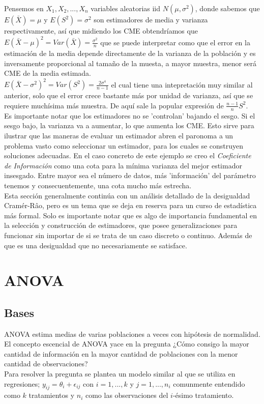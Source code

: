 \documentclass[11pt,a4paper,oneside]{report}
\theoremstyle{definition}
\theoremstyle{plain}
\theoremstyle{remark}
\begin{document}
Pensemos en $X_1,X_2,...,X_n$ variables aleatorias iid $N(\mu, \sigma^{2})$, donde sabemos que $E(\bar{X})=\mu$ y $E(S^{2})=\sigma^2$ son
estimadores de media y varianza respectivamente, así que midiendo los CME obtendríamos que\\
$E(\bar{X}-\mu)^{2}=Var(\bar{X})=\frac{\sigma^{2}}{n}$ que se puede interpretar como que el error en la estimación de la media depende 
directamente de la varianza de la población y es inversamente proporcional al tamaño de la muesta, a mayor muestra, menor será CME de la
media estimada.\\
$E(\bar{X}-\sigma^{2})^{2}=Var(S^2)=\frac{2\sigma^{4}}{n-1}$ el cual tiene una intepretación muy similar al anterior, solo que el error
crece bastante más por unidad de varianza, así que se requiere muchísima más muestra. De aquí sale la popular expresión de 
$\frac{n-1}{n} S^{2}$.\\
Es importante notar que los estimadores no se 'controlan' bajando el sesgo. Si el sesgo bajo, la varianza va a aumentar, lo que 
aumenta los CME. Esto sirve para ilustrar que las maneras de evaluar un estimador abren el paronoma a un problema vasto como seleccionar
un estimador, para los cuales se construyen soluciones adecuadas. En el caso concreto de este ejemplo se creo el \textit{Coeficiente de Información}
como una cota para la mínima varianza del mejor estimador insesgado. Entre mayor sea el número de datos, más 'información' del parámetro 
tenemos y consecuentemente, una cota mucho más estrecha.\\
Esta sección generalmente continúa con un análisis detallado de la desigualdad Cramér-Râo, pero es un tema que se deja en reserva para 
un curso de estadística más formal. Solo es importante notar que es algo de importancia fundamental en la selección y construcción de
estimadores, que posee generalizaciones para funcionar sin importar de si se trata de un caso discreto o continuo. Además de que es una 
desigualdad que no necesariamente se satisface.

\chapter{ANOVA}

\section{Bases}

ANOVA estima medias de varias poblaciones a veces con hipótesis de normalidad. 
El concepto escencial de ANOVA yace en la pregunta ¿Cómo consigo la mayor cantidad de información en la 
mayor cantidad de poblaciones con la menor cantidad de observaciones?\\
Para resolver la pregunta se plantea un modelo similar al que se utiliza en regresiones; 
$y_{ij}=\theta_i + \epsilon_{ij}$ con $i=1,...,k$ y $j=1,...,n_i$ comunmente entendido como $k$ tratamientos 
y $n_i$ como las observaciones del $i$-ésimo tratamiento. 
\end{document}
